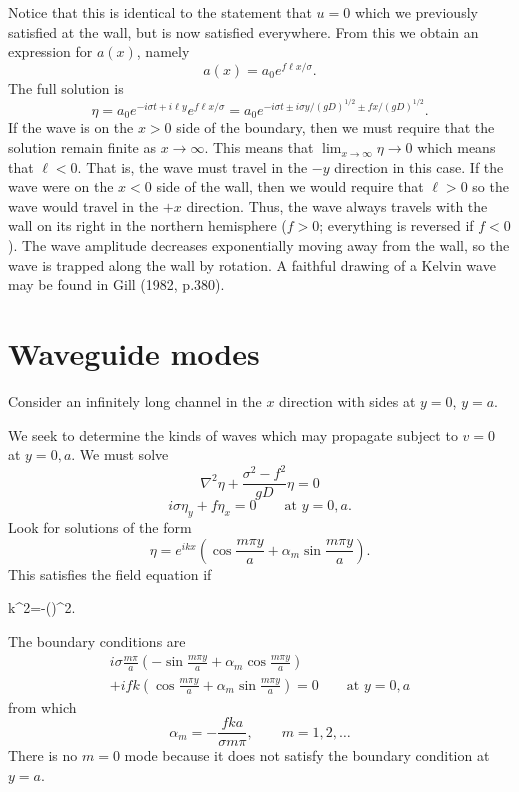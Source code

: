 Notice that this is identical to the statement that $u=0$ which we previously satisfied
at the wall, but is now satisfied everywhere. From this we obtain an expression for
$a(x)$, namely
\[
	a(x)=a_0e^{f\ell x/\sigma}.
\]
The full solution is
\[
	\eta=a_0e^{-i\sigma t+i\ell y}e^{f\ell x/\sigma}
	=a_0e^{-i\sigma t\pm i\sigma y/(gD)^{1/2}\pm f x/(gD)^{1/2}}.
\]
If the wave is on the $x>0$ side of the boundary, then we must require that the
solution remain finite as $x\to\infty$. This means that
$\lim_{x\to\infty}\eta\to0$ which means that $\ell<0$. That is, the wave must travel
in the $-y$ direction in this case. If the wave were on the $x<0$ side of the wall,
then we would require that $\ell>0$ so the wave would travel in the $+x$ direction.
Thus, the wave always travels with the wall on its right in the northern hemisphere
($f>0$; everything is reversed if $f<0$). The wave amplitude decreases exponentially
moving away from the wall, so the wave is trapped along the wall by rotation. A
faithful drawing of a Kelvin wave may be found in Gill (1982, p.380).

\section{Waveguide modes}

Consider an infinitely long channel in the $x$ direction with sides at $y=0$, $y=a$.

\sourcepagebreak


\wavefiguremark

We seek to determine the kinds of waves which may propagate subject to $v=0$ at
$y=0,a$. We must solve
\[
	\nabla^2\eta+\frac{\sigma^2-f^2}{gD}\eta=0
\]
\[
	i\sigma\eta_y+f\eta_x=0
	\qquad\text{at }y=0,a.
\]
Look for solutions of the form
\[
	\eta=e^{ikx}\left(
	\cos\frac{m\pi y}{a}+\alpha_m\sin\frac{m\pi y}{a}
	\right).
\]
This satisfies the field equation if
\begin{waveequation}
	k^2=-\left(\right)^2.
\end{waveequation}
The boundary conditions are
\begin{multline*}
	i\sigma\frac{m\pi}{a}
	\left(-\sin\frac{m\pi y}{a}+\alpha_m\cos\frac{m\pi y}{a}\right)\\
	+ifk\left(\cos\frac{m\pi y}{a}+\alpha_m\sin\frac{m\pi y}{a}\right)=0
	\qquad\text{at }y=0,a
\end{multline*}
from which
\[
	\alpha_m=-\frac{fka}{\sigma m\pi},
	\qquad m=1,2,\ldots
\]
There is no $m=0$ mode because it does not satisfy the boundary condition at $y=a$.

